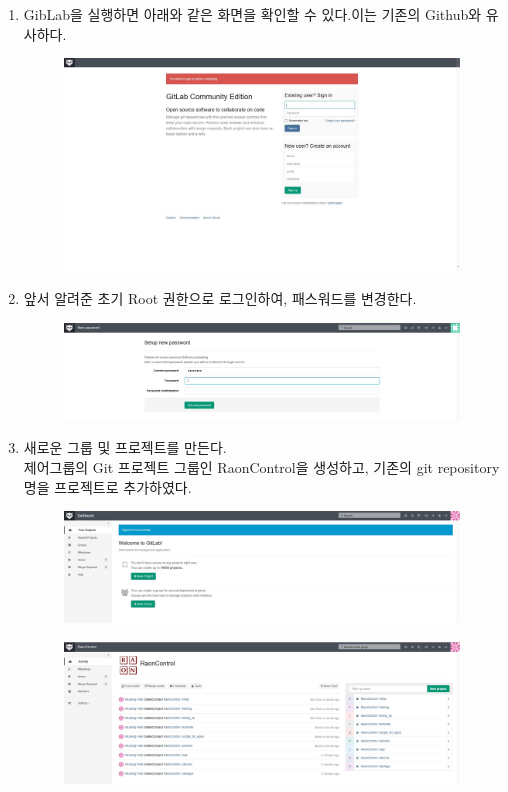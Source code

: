 \documentclass[11pt
  , a4paper
  , article
  , oneside
]{memoir}
\begin{document}
\begin{enumerate}
\item GibLab을 실행하면 아래와 같은 화면을 확인할 수 있다.이는 기존의 Github와 유사하다.
\begin{figure}[h!]
	\centering
	\includegraphics[width=0.99\textwidth]{./images/9.JPG}
\end{figure}

\item 앞서 알려준 초기 Root 권한으로 로그인하여, 패스워드를 변경한다.
\begin{figure}[h!]
	\centering
	\includegraphics[width=0.99\textwidth]{./images/10.JPG}
\end{figure}
\clearpage

\item 새로운 그룹 및 프로젝트를 만든다. \\
제어그룹의 Git 프로젝트 그룹인 RaonControl을 생성하고, 기존의 git repository명을 프로젝트로 추가하였다.
\begin{figure}[h!]
	\centering
	\includegraphics[width=0.99\textwidth]{./images/11.JPG}
\end{figure}
\begin{figure}[h!]
	\centering
	\includegraphics[width=0.99\textwidth]{./images/12.JPG}
\end{figure}
\end{enumerate}
\end{document}
